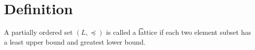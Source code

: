 
\section*{Definition}

A partially ordered set $(L, \preceq)$ is called a \t{lattice} if each two element subset has a least upper bound and greatest lower bound.

\blankpage